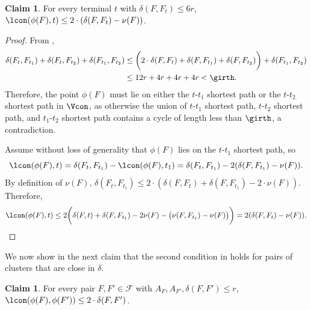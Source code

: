 \documentclass[11pt]{article}
\theoremstyle{definition}
\newtheorem{claim}[theorem]{Claim}
\newcommand{\fset}{{\mathcal{F}}}
\begin{document}
    \begin{claim} \label{clm:g-proj}
        For every terminal $t$ with $\delta(F,F_t) \le 6r$, $\lcon(\phi(F),t) \le 2\cdot (\delta(F,F_t) - \nu(F))$.
    \end{claim} 

    \begin{proof}
From , 
\[
\begin{split}
\delta(F_t,F_{t_1}) + \delta(F_t,F_{t_2}) + \delta(F_{t_1},F_{t_2}) & \le  \bigg(2\cdot \delta(F,F_t) + \delta(F,F_{t_1}) + \delta(F,F_{t_2})\bigg) + \delta(F_{t_1},F_{t_2}) \\ 
& \le  12 r + 4 r + 4 r + 4 r < \girth.
\end{split}
\] 
Therefore, the point $\phi(F)$ must lie on either the $t$-${t_1}$ shortest path or the $t$-${t_2}$ shortest path in $\Vcon$, as otherwise the union of $t$-${t_1}$ shortest path, $t$-${t_2}$ shortest path, and $t_1$-${t_2}$ shortest path contains a cycle of length less than $\girth$, a contradiction.  

Assume without loss of generality that $\phi(F)$ lies on the $t$-${t_1}$ shortest path, so 
$$\lcon(\phi(F),t) = \delta(F_t,F_{t_1}) - \lcon (\phi(F),{t_1}) = \delta(F_t,F_{t_1}) - 2(\delta(F,F_{t_1}) - \nu(F)).$$ By definition of $\nu(F)$, $\delta(F_t,F_{t_1}) \le 2\cdot (\delta(F,F_t)+\delta(F,F_{t_1}) - 2\cdot\nu(F))$. Therefore, $$\lcon(\phi(F),t) \le 2\bigg(\delta(F,t)+\delta(F,F_{t_1}) - 2\nu(F) - \big(\nu(F,F_{t_1}) -\nu(F)\big)\bigg) = 2(\delta(F,F_t)-\nu(F)).$$
    \end{proof}


We now show in the next claim that the second condition in  holds for pairs of clusters that are close in $\delta$.

\begin{claim} \label{clm:g-close}
For every pair $F,F'\in \fset$ with $A_{F}, A_{F'},\delta(F,F') \le r$,  $\lcon(\phi(F),\phi(F')) \le 2\cdot\delta(F,F')$. 
    \end{claim}
\end{document}
